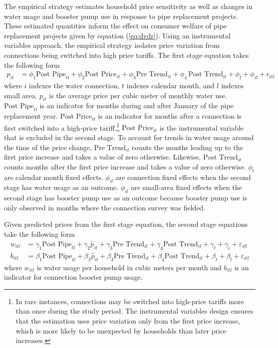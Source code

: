 \documentclass[12pt,table]{article}
\begin{document}
The empirical strategy estimates household price sensitivity as well as changes in water usage and booster pump use in response to pipe replacement projects. These estimated quantities inform the effect on consumer welfare of pipe replacement projects given by equation (\ref{eq:dvdr}).  Using an instrumental variables approach, the empirical strategy isolates price variation from connections being switched into high price tariffs.  The first stage equation takes the following form
\begin{align}
\label{eq:1ststage}
p_{it} &= \phi_1 \text{Post Pipe}_{tl}  +  \phi_2 \text{Post Price}_{it} +  \phi_3\text{Pre Trend}_{it} +\phi_4 \, \text{Post Trend}_{it} +  \phi_t  +  \phi_{il} + \epsilon_{itl} 
\end{align}
where $i$ indexes the water connection, $t$ indexes calendar month, and $l$ indexes small area.  $p_{it}$ is the average price per cubic meter of monthly water use.  $\text{Post Pipe}_{tl}$ is an indicator for months during and after January of the pipe replacement year.  $\text{Post Price}_{it}$ is an indicator for months after a connection is first switched into a high-price tariff.\footnote{In rare instances, connections may be switched into high-price tariffs more than once during the study period.  The instrumental variables design ensures that the estimation uses price variation only from the first price increase, which is more likely to be unexpected by households than later price increases.}  $\text{Post Price}_{it}$ is the instrumental variable that is excluded in the second stage.  To account for trends in water usage around the time of the price change, $\text{Pre Trend}_{it}$ counts the months leading up to the first price increase and takes a value of zero otherwise.  Likewise, $\text{Post Trend}_{it}$ counts months after the first price increase and takes a value of zero otherwise.  $\phi_t$ are calendar month fixed effects.  $\phi_{il}$ are connection fixed effects when the second stage has water usage as an outcome.  $\phi_{il}$ are small-area fixed effects when the second stage has booster pump use as an outcome because booster pump use is only observed in months where the connection survey was fielded.  

Given predicted prices from the first stage equation, the second stage equations take the following form
\begin{align}
w_{itl} &= \gamma_1  \text{Post Pipe}_{tl} + \gamma_2  \hat{p}_{it} + \gamma_3\text{Pre Trend}_{it} +\gamma_4\text{Post Trend}_{it} +    \gamma_t +  \gamma_i +  \varepsilon_{itl}  \label{eq:2ndstage1} \\
b_{itl} &= \beta_1  \text{Post Pipe}_{tl} + \beta_2  \hat{p}_{it} + \beta_3\text{Pre Trend}_{it} +\beta_4\text{Post Trend}_{it} +    \beta_t +  \beta_l +  \varepsilon_{itl} \label{eq:2ndstage2}
\end{align}
where $w_{itl}$ is water usage per household in cubic meters per month and $b_{itl}$ is an indicator for connection booster pump usage.  
\end{document}

